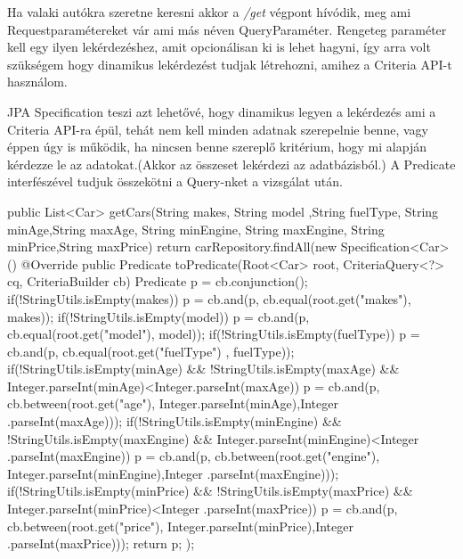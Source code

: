 
Ha valaki autókra szeretne keresni akkor a \textit{/get} végpont hívódik, meg ami Requestparamétereket vár ami más néven QueryParaméter. Rengeteg paraméter kell egy ilyen lekérdezéshez, amit opcionálisan ki is lehet hagyni, így arra volt szükségem hogy dinamikus lekérdezést tudjak létrehozni, amihez a Criteria API-t használom.

JPA Specification teszi azt lehetővé, hogy dinamikus legyen a lekérdezés ami a Criteria API-ra épül, tehát nem kell minden adatnak szerepelnie benne, vagy éppen úgy is működik, ha nincsen benne szereplő kritérium, hogy mi alapján kérdezze le az adatokat.(Akkor az összeset lekérdezi az adatbázisból.) A Predicate interfészével tudjuk összekötni a Query-nket a vizsgálat után.

\begin{java}
public List<Car> getCars(String makes, String model
      ,String fuelType, String minAge,String maxAge,
      String minEngine, String maxEngine, 
      String minPrice,String maxPrice) {
  return carRepository.findAll(new Specification<Car>() {
    @Override
    public Predicate toPredicate(Root<Car> root,
     CriteriaQuery<?> cq, CriteriaBuilder cb) {
        Predicate p = cb.conjunction();
        if(!StringUtils.isEmpty(makes)){
            p = cb.and(p, cb.equal(root.get("makes"), makes));
        }
        if(!StringUtils.isEmpty(model)){
            p = cb.and(p, cb.equal(root.get("model"), model));
        }
        if(!StringUtils.isEmpty(fuelType)){
            p = cb.and(p, cb.equal(root.get("fuelType")
                                       , fuelType));
        }
        if(!StringUtils.isEmpty(minAge) && 
           !StringUtils.isEmpty(maxAge) &&
           Integer.parseInt(minAge)<Integer.parseInt(maxAge)){
            p = cb.and(p, cb.between(root.get("age"),
            Integer.parseInt(minAge),Integer
                                    .parseInt(maxAge)));
        }
        if(!StringUtils.isEmpty(minEngine) &&
           !StringUtils.isEmpty(maxEngine) &&
            Integer.parseInt(minEngine)<Integer
                                       .parseInt(maxEngine)){
            p = cb.and(p, cb.between(root.get("engine"),
            Integer.parseInt(minEngine),Integer
                                       .parseInt(maxEngine)));
        }
        if(!StringUtils.isEmpty(minPrice) &&
           !StringUtils.isEmpty(maxPrice) &&
            Integer.parseInt(minPrice)<Integer
                                       .parseInt(maxPrice)){
             p = cb.and(p, cb.between(root.get("price"),
              Integer.parseInt(minPrice),Integer
                                        .parseInt(maxPrice)));
         }
         return p;
     }
  });
}
\end{java}

